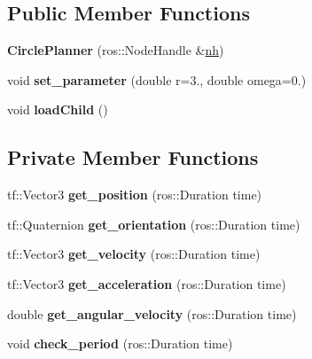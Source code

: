 \subsection*{Public Member Functions}
\begin{DoxyCompactItemize}
\item 
{\bfseries Circle\+Planner} (ros\+::\+Node\+Handle \&\hyperlink{classPlanner_a9714d036f444a07ce90be8d135b9a40c}{nh})\hypertarget{classCirclePlanner_a33a27f97f5a1300d43c80b519fdfb3ef}{}\label{classCirclePlanner_a33a27f97f5a1300d43c80b519fdfb3ef}

\item 
void {\bfseries set\+\_\+parameter} (double r=3., double omega=0.)\hypertarget{classCirclePlanner_a21fef783d5f2252fd1b53d93e869fc65}{}\label{classCirclePlanner_a21fef783d5f2252fd1b53d93e869fc65}

\item 
void {\bfseries load\+Child} ()\hypertarget{classCirclePlanner_a91410cbd01ce10f48a10b754cc1f6fce}{}\label{classCirclePlanner_a91410cbd01ce10f48a10b754cc1f6fce}

\end{DoxyCompactItemize}
\subsection*{Private Member Functions}
\begin{DoxyCompactItemize}
\item 
tf\+::\+Vector3 {\bfseries get\+\_\+position} (ros\+::\+Duration time)\hypertarget{classCirclePlanner_a1d6cdbec03a259af77937f0274dde5d9}{}\label{classCirclePlanner_a1d6cdbec03a259af77937f0274dde5d9}

\item 
tf\+::\+Quaternion {\bfseries get\+\_\+orientation} (ros\+::\+Duration time)\hypertarget{classCirclePlanner_a4e774b6cbc87a3dfa718df5594a0adbf}{}\label{classCirclePlanner_a4e774b6cbc87a3dfa718df5594a0adbf}

\item 
tf\+::\+Vector3 {\bfseries get\+\_\+velocity} (ros\+::\+Duration time)\hypertarget{classCirclePlanner_a5184277b2e174515140514fdec37ba29}{}\label{classCirclePlanner_a5184277b2e174515140514fdec37ba29}

\item 
tf\+::\+Vector3 {\bfseries get\+\_\+acceleration} (ros\+::\+Duration time)\hypertarget{classCirclePlanner_a4bd5c2605a94c4823a76cbf9cdbcbc78}{}\label{classCirclePlanner_a4bd5c2605a94c4823a76cbf9cdbcbc78}

\item 
double {\bfseries get\+\_\+angular\+\_\+velocity} (ros\+::\+Duration time)\hypertarget{classCirclePlanner_afa7c8502da92a63c78711ca92e73fe2b}{}\label{classCirclePlanner_afa7c8502da92a63c78711ca92e73fe2b}

\item 
void {\bfseries check\+\_\+period} (ros\+::\+Duration time)\hypertarget{classCirclePlanner_ab981788d76132e3f03ebedeb128d703a}{}\label{classCirclePlanner_ab981788d76132e3f03ebedeb128d703a}

\end{DoxyCompactItemize}
